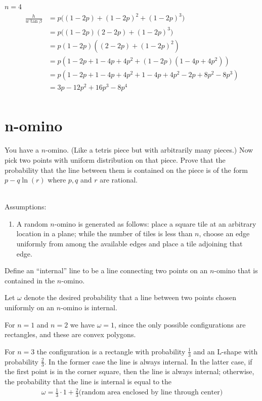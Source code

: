 \documentclass[12pt]{article}
\begin{document}
$n = 4$
\begin{align*}
  \frac{h}{w\tan\beta}
  &= p\Big((1 - 2p) + (1 - 2p)^2 + (1 - 2p)^3\Big)\\
  &= p\Big((1 - 2p)(2 - 2p) + (1 - 2p)^3\Big)\\
  &= p(1 - 2p)((2 - 2p) + (1 - 2p)^2)\\
  &= p(1 - 2p + 1 - 4p + 4p^2 + (1 - 2p)(1 - 4p + 4p^2))\\
  &= p(1 - 2p + 1 - 4p + 4p^2 + 1 - 4p + 4p^2 - 2p + 8p^2 - 8p^3)\\
  &= 3p - 12p^2 + 16p^3 - 8p^4\\
\end{align*}



\section{n-omino}
\begin{mdframed}
  You have a $n$-omino. (Like a tetris piece but with arbitrarily many pieces.)
  Now pick two points with uniform distribution on that piece. Prove that the
  probability that the line between them is contained on the piece is of the
  form $p - q\ln(r)$ where $p,q$ and $r$ are rational.
\end{mdframed}
~\\

Assumptions:
\begin{enumerate}
\item A random $n$-omino is generated as follows: place a square tile at an
  arbitrary location in a plane; while the number of tiles is less than $n$,
  choose an edge uniformly from among the available edges and place a tile
  adjoining that edge.
\end{enumerate}

Define an ``internal'' line to be a line connecting two points on an $n$-omino
that is contained in the $n$-omino.

Let $\omega$ denote the desired probability that a line between two points
chosen uniformly on an $n$-omino is internal.

For $n=1$ and $n=2$ we have $\omega = 1$, since the only possible
configurations are rectangles, and these are convex polygons.

For $n=3$ the configuration is a rectangle with probability $\frac{1}{3}$ and
an L-shape with probability $\frac{2}{3}$. In the former case the line is
always internal. In the latter case, if the first point is in the corner
square, then the line is always internal; otherwise, the probability that the
line is internal is equal to the
\begin{align*}
  \omega = \frac{1}{3}\cdot 1 + \frac{2}{3} \Big(\text{random area enclosed by line through center}\Big)
\end{align*}
\end{document}
